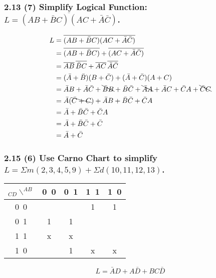     \subsubsection{2.13 (7) \textnormal{Simplify Logical Function: $L=\overline{(AB+\bar{B}C)(AC+\bar{A}\bar{C})}$}.}
    {\color{hwSolution}
        \begin{align*}
            L
            &= \overline{(AB+\bar{B}C)(AC+\bar{A}\bar{C})}\\
            &= \overline{(AB+\bar{B}C)}+\overline{(AC+\bar{A}\bar{C})}\\
            &= \overline{AB}\,\overline{\bar{B}C}+\overline{AC}\,\overline{\bar{A}\bar{C}}\\
            &= (\bar{A}+\bar{B})(B+\bar{C}) + (\bar{A}+\bar{C})(A+C)\\
            &= \bar{A}B+\bar{A}\bar{C}+\bcancel{\bar{B}B}+\bar{B}\bar{C}+\bcancel{\bar{A}A}+\bar{A}C+\bar{C}A+\bcancel{\bar{C}C}\\
            &= \bar{A}(\bcancel{\bar{C}+C})+\bar{A}B+\bar{B}\bar{C}+\bar{C}A\\
            &= \bar{A}+\bar{B}\bar{C}+\bar{C}A\\
            &= \bar{A}+\bar{B}\bar{C}+\bar{C}\\
            &= \bar{A}+\bar{C}
        \end{align*}
    }
    \subsubsection{2.15 (6) \textnormal{Use Carno Chart to simplify $L=\Sigma m(2,3,4,5,9) + \Sigma d(10,11,12,13)$}.}
    {\color{hwSolution}
        \begin{center}
            \begin{tabular}{c|c c c c}
                $_{CD}\smallsetminus^{AB}$
                    & 0~0   & 0~1   & 1~1   & 1~0   \\
                \hline
                0~0 &       &       & 1     & 1     \\
                0~1 & 1     & 1     &       &       \\
                1~1 & x     & x     &       &       \\
                1~0 &       & 1     & x     & x     
            \end{tabular}
            \[L = \bar{A}D+A\bar{D}+BC\bar{D}\]
        \end{center}
    }
